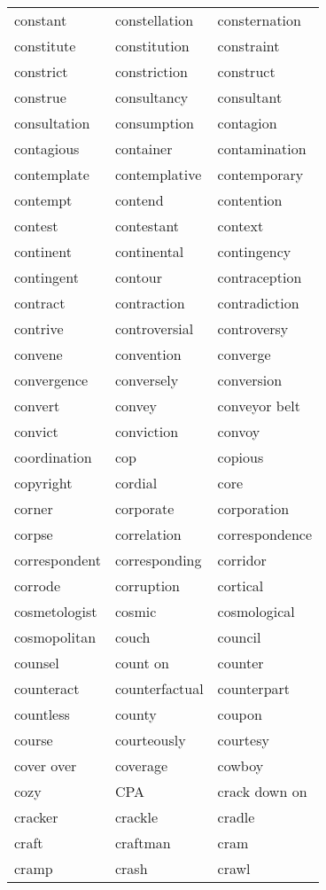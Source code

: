 \documentclass{minimal}
\begin{document}
\begin{longtable}{p{2.7cm}@{\hskip 0.2cm}p{2.7cm}@{\hskip 0.2cm}p{2.7cm}}
constant & constellation & consternation \\
constitute & constitution & constraint \\
constrict & constriction & construct \\
construe & consultancy & consultant \\
consultation & consumption & contagion \\
contagious & container & contamination \\
contemplate & contemplative & contemporary \\
contempt & contend & contention \\
contest & contestant & context \\
continent & continental & contingency \\
contingent & contour & contraception \\
contract & contraction & contradiction \\
contrive & controversial & controversy \\
convene & convention & converge \\
convergence & conversely & conversion \\
convert & convey & conveyor belt \\
convict & conviction & convoy \\
coordination & cop & copious \\
copyright & cordial & core \\
corner & corporate & corporation \\
corpse & correlation & correspondence \\
correspondent & corresponding & corridor \\
corrode & corruption & cortical \\
cosmetologist & cosmic & cosmological \\
cosmopolitan & couch & council \\
counsel & count on & counter \\
counteract & counterfactual & counterpart \\
countless & county & coupon \\
course & courteously & courtesy \\
cover over & coverage & cowboy \\
cozy & CPA & crack down on \\
cracker & crackle & cradle \\
craft & craftman & cram \\
cramp & crash & crawl \\

\end{longtable}
\end{document}
